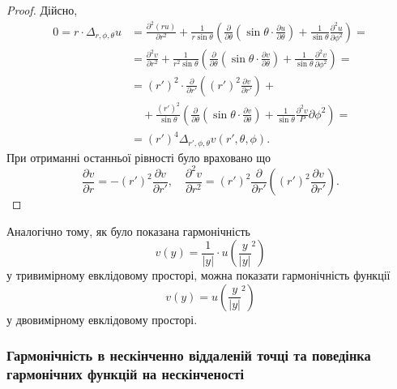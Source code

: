\begin{proof}
	Дійсно, 
	\begin{equation}
		\begin{aligned}
			0 = r \cdot \Delta_{r, \phi, \theta} u &= \frac{\partial^2 (ru)}{\partial r^2} + \frac{1}{r \sin \theta} \left( \frac{\partial}{\partial \theta} \left( \sin \theta \cdot \frac{\partial u}{\partial \theta} \right) + \frac{1}{\sin \theta} \frac{\partial^2 u}{\partial \phi^2} \right) = \\
			&= \frac{\partial^2 v}{\partial r^2} + \frac{1}{r^2 \sin \theta} \left( \frac{\partial}{\partial \theta} \left( \sin \theta \cdot \frac{\partial v}{\partial \theta} \right) + \frac{1}{\sin \theta} \frac{\partial^2 v}{\partial \phi^2} \right) = \\
			&= (r')^2 \cdot \frac{\partial}{\partial r'} \left( (r')^2 \frac{\partial v}{\partial r'} \right) + \\
			& \quad + \frac{(r')^2}{\sin \theta} \left( \frac{\partial}{\partial \theta} \left( \sin \theta \cdot \frac{\partial v}{\partial \theta} \right) + \frac{1}{\sin \theta} \frac{\partial^2 v}P\partial \phi^2 \right) = \\
			&= (r')^4 \Delta_{r', \phi, \theta} v(r', \theta, \phi).
		\end{aligned}
	\end{equation}
	При отриманні останньої рівності було враховано що
	\begin{equation}
		\frac{\partial v}{\partial r} = - (r')^2 \frac{\partial v}{\partial r'}, \quad \frac{\partial^2 v}{\partial r^2} = (r')^2 \frac{\partial}{\partial r'} \left( (r')^2 \frac{\partial v}{\partial r'} \right).
	\end{equation}
\end{proof}

\begin{remark}
	Аналогічно тому, як було показана гармонічність
	\begin{equation}
		v(y) = \frac{1}{|y|} \cdot u \left( \frac{y}{|y|}^2 \right)
	\end{equation}
	у тривимірному евклідовому просторі, можна показати гармонічність функції
	\begin{equation}
		v(y) = u \left( \frac{y}{|y|}^2 \right)
	\end{equation}
	у двовимірному евклідовому просторі.
\end{remark}

\subsubsection{Гармонічність в нескінченно віддаленій точці та поведінка гармонічних функцій на нескінченості}

